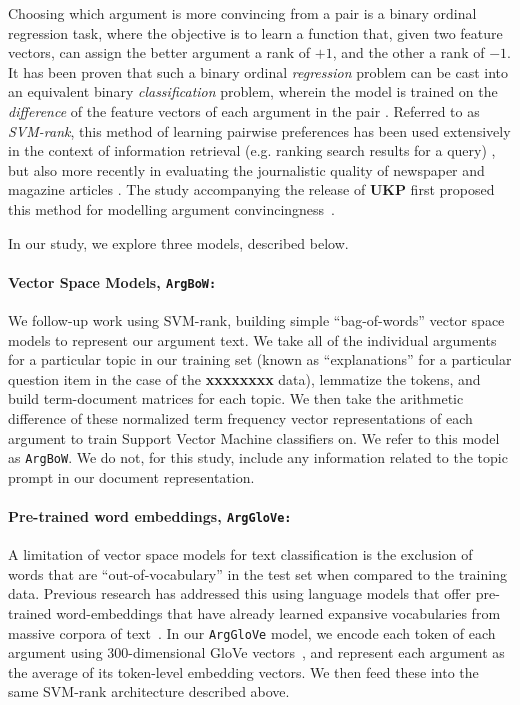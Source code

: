\documentclass[runningheads]{llncs}
\begin{document}
Choosing which argument is more convincing from a pair is a binary 
ordinal regression task, where the objective is to learn a function that, given 
two feature vectors, can assign the better argument a rank of $+1$, and the 
other a rank of $-1$.   
It has been proven that such a binary ordinal \textit{regression} problem can 
be cast into an equivalent binary \textit{classification} problem, wherein the 
model is trained on the \textit{difference} of the feature vectors of each 
argument in the pair \cite{herbrich_support_1999}. 
Referred to as \textit{SVM-rank}, this method of learning pairwise preferences 
has been used extensively in the context of information retrieval (e.g. ranking 
search results for a query) 
\cite{joachims_optimizing_2002}, but also more recently in evaluating the 
journalistic quality of newspaper and magazine articles \cite{louis_what_2013}.
The study accompanying the release of \textbf{UKP} first proposed this method 
for modelling argument convincingness~\cite{habernal_which_2016}.

In our study, we explore three models, described below.

\paragraph{\textbf{Vector Space Models, \tt{ArgBoW}:}}

We follow-up work using SVM-rank, building simple ``bag-of-words'' vector space 
models to represent our argument text. 
We take all of the individual arguments for a particular topic in our training 
set (known as  ``explanations'' for a particular question item in the case of 
the \textbf{xxxxxxxx} data), lemmatize the tokens, and build term-document 
matrices for each topic.
We then take the arithmetic difference of these normalized term frequency 
vector representations of each argument to train Support Vector Machine 
classifiers on. 
We refer to this model as \verb|ArgBoW|.
We do not, for this study, include any information related to the topic prompt 
in our document representation.


\paragraph{\textbf{Pre-trained word embeddings, \tt{ArgGloVe}:}}
A limitation of vector space models for text classification is the exclusion of 
words that are ``out-of-vocabulary'' in the test set when compared to the 
training data.
Previous research has addressed this using language models that 
offer pre-trained word-embeddings that have already learned expansive 
vocabularies from massive corpora of 
text~\cite{habernal_which_2016}\cite{gleize_are_2019}.    
In our \verb|ArgGloVe| model, we encode each token of each argument using 
300-dimensional GloVe vectors~\cite{pennington_glove:_2014}, 
and represent each argument as the average of its token-level embedding 
vectors. 
We then feed these into the same SVM-rank architecture described above. 
\end{document}
